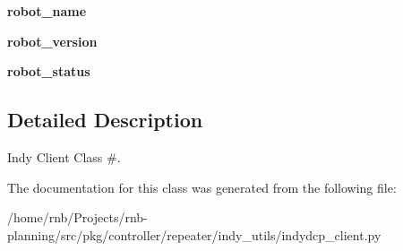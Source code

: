 \begin{DoxyCompactItemize}
{\bfseries robot\+\_\+name}
\item 
\mbox{\label{classrnb-planning_1_1src_1_1pkg_1_1controller_1_1repeater_1_1indy__utils_1_1indydcp__client_1_1_indy_d_c_p_client_aeca9f31143d72547805f16e0f62d10b7}} 
{\bfseries robot\+\_\+version}
\item 
\mbox{\label{classrnb-planning_1_1src_1_1pkg_1_1controller_1_1repeater_1_1indy__utils_1_1indydcp__client_1_1_indy_d_c_p_client_a6cf9aee64461847127322920dbd45155}} 
{\bfseries robot\+\_\+status}
\end{DoxyCompactItemize}


\subsection{Detailed Description}
Indy Client Class \#. 

The documentation for this class was generated from the following file\+:\begin{DoxyCompactItemize}
\item 
/home/rnb/\+Projects/rnb-\/planning/src/pkg/controller/repeater/indy\+\_\+utils/indydcp\+\_\+client.\+py\end{DoxyCompactItemize}
